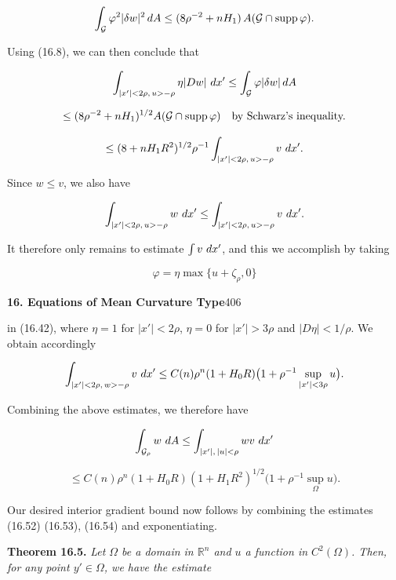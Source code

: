\[
\int_{\mathcal{G}} \varphi^2|\delta w|^2\,dA \le (8\rho^{-2}+nH_1)\,A(\mathcal{G}\cap\operatorname{supp}\varphi).
\]

Using (16.8), we can then conclude that

\[
\int_{|x'|<2\rho,\,u>-\rho}\eta|Dw|\,\,dx'
\le \int_{\mathcal{G}} \varphi|\delta w|\,dA
\]

\[
\le (8\rho^{-2}+nH_1)^{1/2}A(\mathcal{G}\cap\operatorname{supp}\varphi)
\quad\text{by Schwarz's inequality.}
\]

\[
\le (8+nH_1R^2)^{1/2}\rho^{-1}
\int_{|x'|<2\rho,\,u>-\rho} v\,\,dx'.
\]

Since $w\le v$, we also have

\[
\int_{|x'|<2\rho,\,u>-\rho} w\,\,dx' \le \int_{|x'|<2\rho,\,u>-\rho} v\,\,dx'.
\]

It therefore only remains to estimate $\int v\,\,dx'$, and this we accomplish by taking

\[
\varphi=\eta\max\{u+\zeta_\rho,0\}
\]



\pagestyle{empty}



\setcounter{page}{406}

\noindent\textbf{16. Equations of Mean Curvature Type}\hfill 406

\bigskip

in (16.42), where $\eta=1$ for $|x'|<2\rho$, $\eta=0$ for $|x'|>3\rho$ and $|D\eta|<1/\rho$. We obtain accordingly

\[
\int_{|x'|<2\rho,\,w>-\rho} v\,\,dx' \le C(n)\rho^n(1+H_0R)\bigl(1+\rho^{-1}\sup_{|x'|<3\rho}u\bigr).
\]

Combining the above estimates, we therefore have

\[
\int_{\mathcal{G}_\rho} w\,\,dA \le \int_{|x'|,\,|u|<\rho} wv\,\,dx'
\]

\begin{equation}\tag{16.54}
\le C(n)\rho^n(1+H_0R)(1+H_1R^2)^{1/2}\bigl(1+\rho^{-1}\sup_{\Omega}u\bigr).
\end{equation}

Our desired interior gradient bound now follows by combining the estimates
(16.52) (16.53), (16.54) and exponentiating.

\medskip

\noindent\textbf{Theorem 16.5.} \textit{Let $\Omega$ be a domain in $\mathbb{R}^n$ and $u$ a function in $C^2(\Omega)$. Then, for any point $y' \in \Omega$, we have the estimate}

